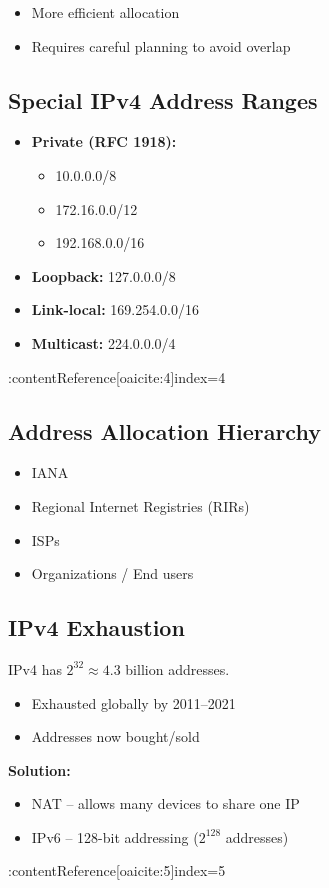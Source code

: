 \begin{itemize}
    \item More efficient allocation
    \item Requires careful planning to avoid overlap
\end{itemize}

\subsection{Special IPv4 Address Ranges}
\begin{itemize}
    \item \textbf{Private (RFC 1918):}
    \begin{itemize}
        \item 10.0.0.0/8
        \item 172.16.0.0/12
        \item 192.168.0.0/16
    \end{itemize}
    \item \textbf{Loopback:} 127.0.0.0/8
    \item \textbf{Link-local:} 169.254.0.0/16
    \item \textbf{Multicast:} 224.0.0.0/4
\end{itemize} :contentReference[oaicite:4]{index=4}

\subsection{Address Allocation Hierarchy}
\begin{itemize}
    \item IANA
    \item Regional Internet Registries (RIRs)
    \item ISPs
    \item Organizations / End users
\end{itemize}

\subsection{IPv4 Exhaustion}
IPv4 has $2^{32} \approx 4.3$ billion addresses.

\begin{itemize}
    \item Exhausted globally by 2011--2021
    \item Addresses now bought/sold
\end{itemize}

\textbf{Solution:}
\begin{itemize}
    \item NAT -- allows many devices to share one IP
    \item IPv6 -- 128-bit addressing ($2^{128}$ addresses)
\end{itemize} :contentReference[oaicite:5]{index=5}

